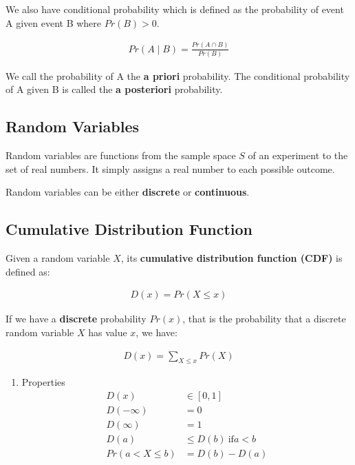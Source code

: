 \documentclass[11pt]{article}
\begin{document}
We also have conditional probability which is defined as the probability of event A given event B where \(Pr\left(B\right) > 0\).

\begin{align*}
     Pr\left(A \mid B\right) = \frac{Pr\left(A \cap B\right)}{Pr\left(B\right)}
\end{align*}

We call the probability of A the \textbf{a priori} probability. The conditional probability of A given B is called the \textbf{a posteriori} probability.

\subsection{Random Variables}
\label{sec:orgc1d1653}
Random variables are functions from the sample space \(S\) of an experiment to the set of real numbers. It simply assigns a real number to each possible outcome.

Random variables can be either \textbf{discrete} or \textbf{continuous}.

\subsection{Cumulative Distribution Function}
\label{sec:org1936da3}
Given a random variable \(X\), its \textbf{cumulative distribution function (CDF)} is defined as:

 \begin{align*}
     D\left( x \right) = Pr\left(X \leq x\right)
\end{align*}

If we have a \textbf{discrete} probability \(Pr\left( x \right)\), that is the probability that a discrete random variable \(X\) has value \(x\), we have:

\begin{align*}
    D\left( x \right) = \sum_{X \leq x} Pr\left( X \right)
\end{align*}

\begin{enumerate}
\item Properties
\label{sec:orge03b21b}
\begin{align*}
    D\left( x \right) &\in \left[0,1\right] \\
    D\left( -\infty \right) &= 0 \\
    D\left( \infty \right) &= 1 \\
    D\left( a \right) &\leq D\left( b \right)\ \text{if} a < b \\
    Pr\left( a < X \leq b \right) &= D\left( b \right) - D\left( a \right)
\end{align*}
\end{enumerate}
\end{document}
